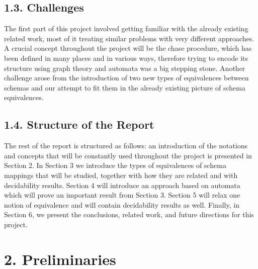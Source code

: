 \documentclass[11pt, a4paper, dvipsnames]{article}
\begin{document}
\subsection{1.3. Challenges}
The first part of this project involved getting familiar with the already existing related work, most of it treating similar problems with very different approaches. A crucial concept throughout the project will be the chase procedure, which has been defined in many places and in various ways, therefore trying to encode its structure using graph theory and automata was a big stepping stone. Another challenge arose from the introduction of two new types of equivalences between schemas and our attempt to fit them in the already existing picture of schema equivalences.

\subsection{1.4. Structure of the Report}
The rest of the report is structured as follows: an introduction of the notations and concepts that will be constantly used throughout the project is presented in Section 2.  In Section 3 we introduce the types of equivalences of schema mappings that will be studied, together with how they are related and with decidability results. Section 4 will introduce an approach based on automata which will prove an important result from Section 3. Section 5 will relax one notion of equivalence and will contain decidability results as well. Finally, in Section 6, we present the conclusions, related work, and future directions for this project. 

\newpage

\section{2. Preliminaries}
\end{document}
